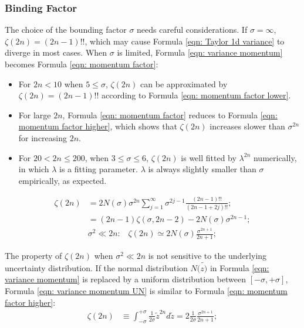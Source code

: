 \documentclass[twoside]{article}
\numberwithin{equation}{section}
\newcommand{\eqspace}{\;\;\;}
\begin{document}
\subsubsection{Binding Factor}

The choice of the bounding factor $\sigma$ needs careful considerations.
If $\sigma = \infty$, $\zeta(2n) = (2n - 1)!!$, which may cause Formula \eqref{eqn: Taylor 1d variance} to diverge in most cases.
When $\sigma$ is limited, Formula \eqref{eqn: variance momentum} becomes Formula \eqref{eqn: momentum factor}:
\begin{itemize}
\item For $2n < 10$ when $5 \leq \sigma$, $\zeta(2n)$ can be approximated by $\zeta(2n) = (2n-1)!!$ according to Formula \eqref{eqn: momentum factor lower}.  

\item For large $2n$, Formula \eqref{eqn: momentum factor} reduces to Formula \eqref{eqn: momentum factor higher}, which shows that $\zeta(2n)$ increases slower than $\sigma^{2n}$ for increasing $2n$.

\item For $20 < 2n \leq 200$, when $3 \leq \sigma \leq 6$, $\zeta(2n)$ is well fitted by $\lambda^{2n}$ numerically, in which $\lambda$ is a fitting parameter. 
$\lambda$ is always slightly smaller than $\sigma$ empirically, as expected.
\end{itemize}
\begin{align}
\label{eqn: momentum factor} 
\zeta(2n) &= 2 N(\sigma) \sigma^{2n} \sum_{j=1}^{\infty} \sigma^{2j-1} \frac{(2n - 1)!!}{(2n-1 + 2j)!!}; \\
\label{eqn: momentum factor lower} 
 &= (2n - 1) \zeta(\sigma, 2n - 2) - 2 N(\sigma) \sigma^{2n - 1}; \\
\label{eqn: momentum factor higher} 
&\sigma^2 \ll 2n:\eqspace \zeta(2n) \simeq 2 N(\sigma) \frac{\sigma^{2n+1}}{2n+1};
\end{align}

The property of $\zeta(2n)$ when $\sigma^2 \ll 2n$ is not sensitive to the underlying uncertainty distribution.  If the normal distribution $N(\tilde{z)}$ in Formula \eqref{eqn: variance momentum} is replaced by a uniform distribution between $[-\sigma, +\sigma]$,  Formula \eqref{eqn: variance momentum UN} is similar to Formula \eqref{eqn: momentum factor higher}:
\begin{align}
\label{eqn: variance momentum UN}
\zeta(2n) &\equiv \int_{-\sigma}^{+\sigma} \frac{1}{2 \sigma} \tilde{z}^{2n} d \tilde{z} = 2 \frac{1}{2 \sigma} \frac{{\sigma}^{2n+1}}{2n + 1}; 
\end{align}
\end{document}
